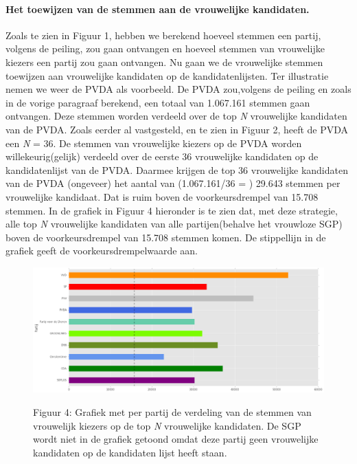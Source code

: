 \paragraph{Het toewijzen van de stemmen aan de vrouwelijke kandidaten.}
Zoals te zien in Figuur 1, hebben we berekend hoeveel stemmen een partij, volgens de peiling, zou gaan ontvangen en hoeveel stemmen van vrouwelijke kiezers een partij zou gaan ontvangen. Nu gaan we de vrouwelijke stemmen toewijzen aan vrouwelijke kandidaten op de kandidatenlijsten. Ter illustratie nemen we weer de PVDA als voorbeeld. De PVDA zou,volgens de peiling en zoals in de vorige paragraaf berekend, een totaal van 1.067.161 stemmen gaan ontvangen. Deze stemmen worden verdeeld over de top \textit{N} vrouwelijke kandidaten van de PVDA. Zoals eerder al vastgesteld, en te zien in Figuur 2, heeft de PVDA een \textit{N} = 36. De stemmen van vrouwelijke kiezers op de PVDA worden willekeurig(gelijk) verdeeld over de eerste 36 vrouwelijke kandidaten op de kandidatenlijst van de PVDA. Daarmee krijgen de top 36 vrouwelijke kandidaten van de PVDA (ongeveer) het aantal van (1.067.161/36 = ) 29.643 stemmen per vrouwelijke kandidaat. Dat is ruim boven de voorkeursdrempel van 15.708 stemmen. In de grafiek in Figuur 4 hieronder is te zien dat, met deze strategie, alle top \textit{N} vrouwelijke kandidaten van alle partijen(behalve het vrouwloze SGP) boven de voorkeursdrempel van 15.708 stemmen komen. De stippellijn in de grafiek geeft de voorkeursdrempelwaarde aan. 

  
\begin{figure}[H]
\begin{center}
	\includegraphics[width=\linewidth]	{stemmen_op_vrouwen_topN.png}
		\begin{center}
			Figuur 4: Grafiek met per partij de verdeling van de stemmen van vrouwelijk kiezers op de top \textit{N} vrouwelijke kandidaten. De SGP wordt niet in de grafiek getoond omdat deze partij geen vrouwelijke kandidaten op de kandidaten lijst heeft staan. 
		\end{center}
\end{center}
\end{figure}

